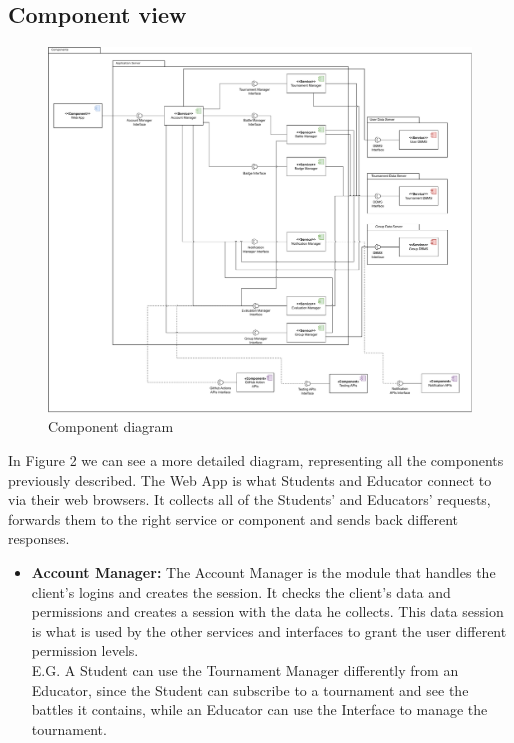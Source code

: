 \documentclass{article}
\begin{document}
{\subsection{Component view}
\begin{figure}[H]
    \centering
    \hspace*{-4.1cm}\includegraphics[scale=0.5]{images/ComponentView.pdf}
    \caption{Component diagram}
    \label{fig:componentView}
\end{figure}
In Figure 2 we can see a more detailed diagram, representing all the components previously described.
The Web App is what Students and Educator connect to via their web browsers.
It collects all of the Students' and Educators' requests, forwards them to the right service or component and sends back different responses.
\\
\begin{itemize}
\item \textbf{Account Manager:} The Account Manager is the module that handles the client's logins and creates the session. 
It checks the client's data and permissions and creates a session with the data he collects. This data session is what is used by the other services and
interfaces to grant the user different permission levels. \\
E.G. A Student can use the Tournament Manager differently from an Educator, since the Student can subscribe to a tournament and see the battles it contains,
while an Educator can use the Interface to manage the tournament.\\

\end{itemize}}
\end{document}
